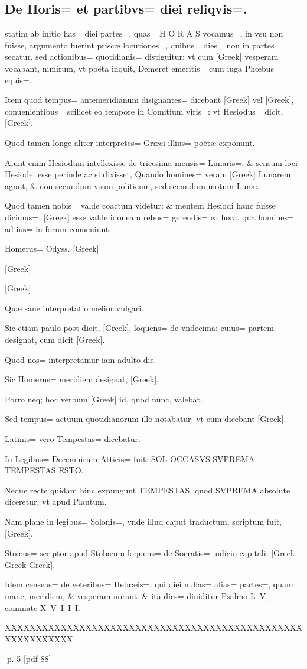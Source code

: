 \subsection{De Horis= et partibvs= diei reliqvis=.}
\setcounter{parcount}{0}
\begin{parnumbers}

 statim ab initio has= diei partes=, quas= H O R A S vocamus=, in vsu non fuisse, argumento fuerint priscæ locutiones=,  quibus= dies= non in partes= secatur, sed actionibus= quotidianis= distiguitur: vt cum [Greek] vesperam vocabant, nimirum, vt poëta inquit, Demeret emeritis= cum iuga Phœbus= equis=.

Item quod tempus= antemeridianum disignantes= dicebant [Greek] vel [Greek], conuenientibus= scilicet eo tempore in Comitium viris=: vt Hesiodus= dicit, [Greek].

Quod tamen longe aliter interpretes= Græci illius= poëtæ exponunt.

Aiunt enim Hesiodum intellexisse de tricesima mensis= Lunaris=: \& sensum loci Hesiodei esse perinde ac si dixisset, Quando homines= veram [Greek] Lunarem agunt, \& non secundum vsum politicum, sed secundum motum Lunæ.

Quod  tamen nobis= valde coactum videtur: \& mentem Hesiodi hanc fuisse dicimus=: [Greek] esse valde idoneam rebus= gerendis= ea hora, qua homines= ad ius= in forum conueniunt.

Homerus= Odyss. [Greek]

[Greek]

[Greek]

Quæ sane interpretatio melior vulgari.

Sic etiam paulo post dicit, [Greek], loquens= de vndecima: cuius= partem designat, cum dicit [Greek].

Quod nos= interpretamur iam adulto die.

Sic Homerus= meridiem designat, [Greek].

Porro neq; hoc verbum [Greek] id, quod nunc, valebat.

Sed tempus= actuum quotidianorum illo notabatur: vt cum dicebant [Greek].

 Latinis= vero Tempestas= dicebatur.

In Legibus= Decemuirum Atticis= fuit: SOL OCCASVS SVPREMA TEMPESTAS ESTO.

Neque recte quidam hinc expungunt TEMPESTAS. quod SVPREMA absolute diceretur, vt apud Plautum.

Nam plane in legibus= Solonis=, vnde illud caput traductum, scriptum fuit, [Greek].

Stoicus= scriptor apud Stobæum loquens= de Socratis= iudicio capitali: [Greek Greek Greek].

Idem censeas= de veteribus= Hebræis=,  qui diei nullas= alias= partes=, quam mane, meridiem, \& vesperam norant. \& ita dies= diuiditur Psalmo L V, commate X V I I I.

XXXXXXXXXXXXXXXXXXXXXXXXXXXXXXXXXXXXXXXXXXXXXXXXXXXXXXXXXXX
\end{parnumbers}
\clearpage
p. 5 [pdf 88]

